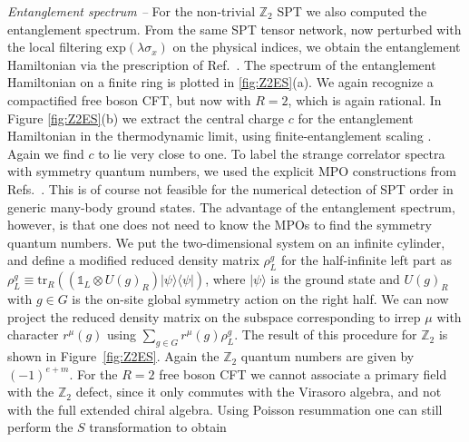 \documentclass[aps,pra,twocolumn,superscriptaddress,10pt,article,nofootinbib,showpacs]{revtex4-1}
\begin{document}
\emph{Entanglement spectrum --} For the non-trivial $\mathbb{Z}_2$ SPT we also computed the entanglement spectrum. From the same SPT tensor network, now perturbed with the local filtering $\text{exp}(\lambda \sigma_x)$ on the physical indices, we obtain the entanglement Hamiltonian via the prescription of Ref.~\cite{CiracPoilblanc}. The spectrum of the entanglement Hamiltonian on a finite ring is plotted in \ref{fig:Z2ES}(a). We again recognize a compactified free boson CFT, but now with $R=2$, which is again rational. In Figure \ref{fig:Z2ES}(b) we extract the central charge $c$ for the entanglement Hamiltonian in the thermodynamic limit, using finite-entanglement scaling \cite{Tagliacozzo,PollmannMukerjee}. Again we find $c$ to lie very close to one. To label the strange correlator spectra with symmetry quantum numbers, we used the explicit MPO constructions from Refs.~\cite{ChenLiu,SPTpaper}. This is of course not feasible for the numerical detection of SPT order in generic many-body ground states. The advantage of the entanglement spectrum, however, is that one does not need to know the MPOs to find the symmetry quantum numbers. We put the two-dimensional system on an infinite cylinder, and define a modified reduced density matrix $\rho_L^g$ for the half-infinite left part as $\rho_L^g\equiv \text{tr}_R\left((\mathds{1}_L\otimes U(g)_R)|\psi\rangle\langle\psi|\right)$, where $|\psi\rangle$ is the ground state and $U(g)_R$ with $g\in G$ is the on-site global symmetry action on the right half. We can now project the reduced density matrix on the subspace corresponding to irrep $\mu$ with character $r^\mu(g)$ using $\sum_{g\in G} r^{\mu}(g)\rho^g_L$. The result of this procedure for $\mathbb{Z}_2$ is shown in Figure~\ref{fig:Z2ES}. Again the $\mathbb{Z}_2$ quantum numbers are given by $(-1)^{e+m}$. For the $R=2$ free boson CFT we cannot associate a primary field with the $\mathbb{Z}_2$ defect, since it only commutes with the Virasoro algebra, and not with the full extended chiral algebra. Using Poisson resummation one can still perform the $S$ transformation to obtain
\end{document}
